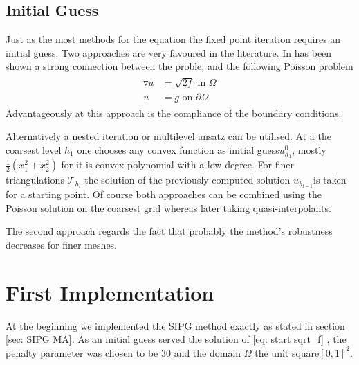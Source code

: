 \subsection{Initial Guess}\label{sec: initial guess}
Just as the most methods for the \MA equation the fixed point iteration requires an initial guess. Two approaches are very favoured in the literature.
In \cite[Remark 2.1]{DG2006a} has been shown a strong connection between the \MA proble, and  the following Poisson problem
\begin{align}
	\begin{split}
	\triangledown u &= \sqrt{2f} \text{ in } \Omega \\ 
	u &= g \text{ on }\partial \Omega.
	\end{split}\label{eq: start sqrt_f}
\end{align}
Advantageously at this approach is the compliance of the boundary conditions.

Alternatively a nested iteration or multilevel ansatz can be utilised. At a the coarsest level $h_1$ one chooses any convex function as initial guess$u^0_{h_1}$, mostly $\frac 1 2 ({x_1^2} + {x_2^2}) $ for it is convex polynomial with a low degree. For finer triangulations $\mathcal{T}_{h_{l}}$ the solution of the previously computed solution $u_{h_{l-1}}$is taken for a starting point. Of course both approaches can be combined using the Poisson solution on the coarsest grid whereas later taking quasi-interpolants.

The second approach regards the fact that probably the method's robustness decreases for finer meshes.


\section{First Implementation}
At the beginning we implemented the SIPG method exactly as stated in section \ref{sec: SIPG MA}.
As an initial guess served the solution of \eqref{eq: start sqrt_f} , the penalty parameter was chosen to be 30 and the domain $\Omega$ the unit square$[0,1]^2$.


